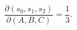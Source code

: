 \begin{equation}
  \frac{\partial (s_0,s_1,s_2)}{\partial (A,B,C)}
    =\frac{1}{3}.
\end{equation}

